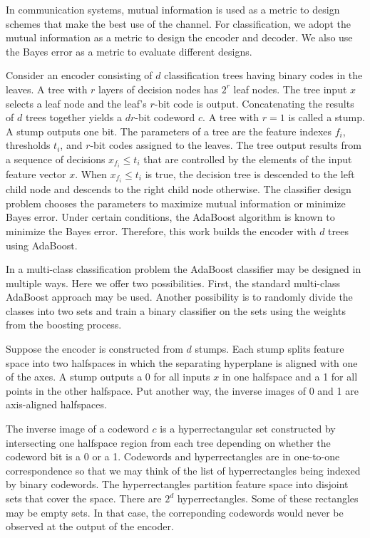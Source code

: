 \documentclass{article}
\begin{document}
In communication systems, mutual information is used as a metric to design schemes that make the best use of the channel.  For classification, we adopt the mutual information as a metric to design the encoder and decoder.  We also use the Bayes error as a metric to evaluate different designs.

Consider an encoder consisting of $d$ classification trees having binary codes in the leaves.  A tree with $r$ layers of decision nodes has $2^r$ leaf nodes.  The tree input $x$ selects a leaf node and the leaf's $r$-bit code is output.  Concatenating the results of $d$ trees together yields a $dr$-bit codeword $c$.   A tree with $r=1$ is called a stump.  A stump outputs one bit.  The parameters of a tree are the feature indexes $f_i$, thresholds $t_i$, and $r$-bit codes assigned to the leaves.  The tree output results from a sequence of decisions $x_{f_i} \leq t_i$ that are controlled by the elements of the input feature vector $x$.  When $x_{f_i} \leq t_i$ is true, the decision tree is descended to the left child node and descends to the right child node otherwise.  The classifier design problem chooses the parameters to maximize mutual information or minimize Bayes error.  Under certain conditions, the AdaBoost algorithm is known to minimize the Bayes error.  Therefore, this work builds the encoder with $d$ trees using AdaBoost.

In a multi-class classification problem the AdaBoost classifier may be designed in multiple ways.  Here we offer two possibilities.  First, the standard multi-class AdaBoost approach may be used.  Another possibility is to randomly divide the classes into two sets and train a binary classifier on the sets using the weights from the boosting process.

Suppose the encoder is constructed from $d$ stumps.  Each stump splits feature space into two halfspaces in which the separating hyperplane is aligned with one of the axes.  A stump outputs a 0 for all inputs $x$ in one halfspace and a 1 for all points in the other halfspace.  Put another way, the inverse images of 0 and 1 are axis-aligned halfspaces.

The inverse image of a codeword $c$ is a hyperrectangular set constructed by intersecting one halfspace region from each tree depending on whether the codeword bit is a 0 or a 1.  Codewords and hyperrectangles are in one-to-one correspondence so that we may think of the list of hyperrectangles being indexed by binary codewords.  The hyperrectangles partition feature space into disjoint sets that cover the space.  There are $2^d$ hyperrectangles.  Some of these rectangles may be empty sets.  In that case, the correponding codewords would never be observed at the output of the encoder.
\end{document}
